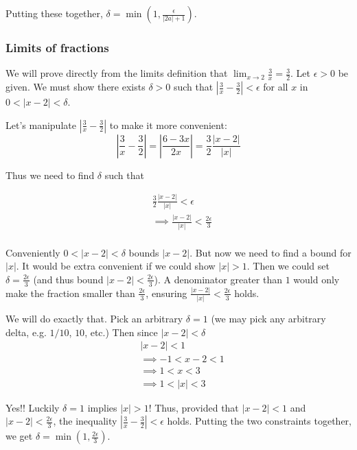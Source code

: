Putting these together, $\delta=\min(1, \frac{\epsilon}{|2a|+1})$.

\subsubsection*{Limits of fractions}

We will prove directly from the limits definition that
$\lim_{x\to 2}\frac{3}{x}=\frac{3}{2}$. Let $\epsilon>0$ be given. We must show
there exists $\delta>0$ such that $|\frac{3}{x}-\frac{3}{2}|<\epsilon$ for all
$x$ in $0<|x-2|<\delta$.

\vs

Let's manipulate $|\frac{3}{x}-\frac{3}{2}|$ to make it more convenient:
\[\left|\frac{3}{x}-\frac{3}{2}\right|=\left|\frac{6-3x}{2x}\right|=\frac{3}{2}\frac{|x-2|}{|x|}\]

Thus we need to find $\delta$ such that

\begin{align*}
&\frac{3}{2}\frac{|x-2|}{|x|}<\epsilon\\
&\implies \frac{|x-2|}{|x|}<\frac{2\epsilon}{3}\\
\end{align*}

Conveniently $0<|x-2|<\delta$ bounds $|x-2|$. But now we need to find a
bound for $|x|$. It would be extra convenient if we could show
$|x|>1$. Then we could set $\delta=\frac{2\epsilon}{3}$ (and thus bound
$|x-2|<\frac{2\epsilon}{3}$). A denominator greater than $1$ would only make
the fraction smaller than $\frac{2\epsilon}{3}$, ensuring
$\frac{|x-2|}{|x|}<\frac{2\epsilon}{3}$ holds.

\vs

We will do exactly that. Pick an arbitrary $\delta=1$ (we may pick any
arbitrary delta, e.g. $1/10$, $10$, etc.) Then since $|x-2|<\delta$
\begin{align*}
    &|x-2|<1\\
    &\implies -1<x-2<1\\
    &\implies 1<x<3\\
    &\implies 1<|x|<3
\end{align*}

Yes!! Luckily $\delta=1$ implies $|x|>1$! Thus, provided that
$|x-2|<1$ and $|x-2|<\frac{2\epsilon}{3}$, the inequality
$|\frac{3}{x}-\frac{3}{2}|<\epsilon$ holds. Putting the two constraints
together, we get $\delta=\min(1, \frac{2\epsilon}{3})$.

